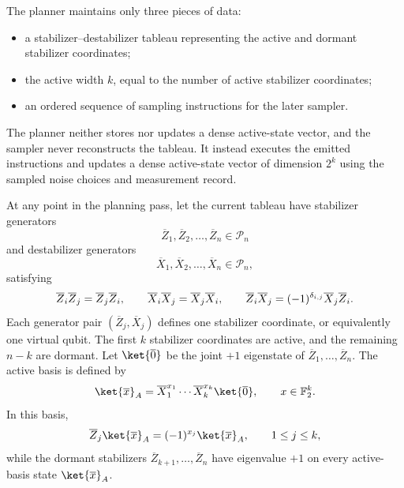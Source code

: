 \documentclass[a4paper,onecolumn,unpublished]{quantumarticle}
\DeclarePairedDelimiter\rbra{\lparen}{\rparen}
\newcommand{\cP}{\mathcal{P}}
\newcommand{\FF}{\mathbb{F}}
\begin{document}
The planner maintains only three pieces of data:
\begin{itemize}
    \item a stabilizer--destabilizer tableau representing the active and dormant stabilizer coordinates;
    \item the active width $k$, equal to the number of active stabilizer coordinates;
    \item an ordered sequence of sampling instructions for the later sampler.
\end{itemize}
The planner neither stores nor updates a dense active-state vector, and the sampler never reconstructs the tableau.
It instead executes the emitted instructions and updates a dense active-state vector of dimension $2^k$ using the sampled noise choices and measurement record.

At any point in the planning pass, let the current tableau have stabilizer generators
\begin{equation*}
    \overline{Z}_1,\overline{Z}_2,\ldots,\overline{Z}_n \in \cP_n
\end{equation*}
and destabilizer generators
\begin{equation*}
    \overline{X}_1,\overline{X}_2,\ldots,\overline{X}_n \in \cP_n,
\end{equation*}
satisfying
\begin{equation*}
    \overline{Z}_i\overline{Z}_j = \overline{Z}_j\overline{Z}_i,
    \qquad
    \overline{X}_i\overline{X}_j = \overline{X}_j\overline{X}_i,
    \qquad
    \overline{Z}_i\overline{X}_j = \rbra{-1}^{\delta_{i,j}}\overline{X}_j\overline{Z}_i.
\end{equation*}
Each generator pair $(\overline{Z}_j,\overline{X}_j)$ defines one stabilizer coordinate, or equivalently one virtual qubit.
The first $k$ stabilizer coordinates are active, and the remaining $n-k$ are dormant.
Let $\ket{\overline{0}}$ be the joint $+1$ eigenstate of $\overline{Z}_1,\ldots,\overline{Z}_n$.
The active basis is defined by
\begin{equation}\label{eq:active-basis}
    \ket{\overline{x}}_A = \overline{X}_1^{x_1}\cdots
    \overline{X}_k^{x_k}
    \ket{\overline{0}},
    \qquad
    x\in\FF_2^k.
\end{equation}
In this basis,
\begin{equation}\label{eq:active-logical-z}
    \overline{Z}_j\ket{\overline{x}}_A = \rbra{-1}^{x_j}\ket{\overline{x}}_A, \qquad 1\leq j\leq k,
\end{equation}
while the dormant stabilizers $\overline{Z}_{k+1},\ldots,\overline{Z}_n$ have eigenvalue $+1$ on every active-basis state $\ket{\overline{x}}_A$.
\end{document}
